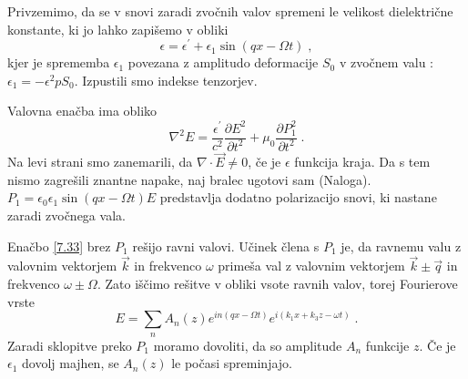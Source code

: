 \documentclass[11pt,fleqn]{book} %
\begin{document}
Privzemimo, da se v snovi zaradi zvočnih valov spremeni le velikost
dielektrične konstante, ki jo lahko zapišemo v obliki 
\begin{equation}
\epsilon=\epsilon^{\prime}+\epsilon_{1}\sin(qx-\Omega t)\;,\label{7.33}
\end{equation}
 kjer je sprememba $\epsilon_{1}$ povezana z amplitudo deformacije
$S_{0}$ v zvočnem valu :$\epsilon_{1}=-\epsilon^{2}pS_{0}$. Izpustili
smo indekse tenzorjev.

Valovna enačba ima obliko 
\begin{equation}
\nabla^{2}E=\frac{\epsilon^{\prime}}{c^{2}}{\frac{\partial E^{2}}{\partial t^{2}}}+\mu_{0}{\frac{\partial P_{1}^{2}}{\partial t^{2}}}\;.\label{7.33}
\end{equation}
 Na levi strani smo zanemarili, da $\nabla\cdot\vec{E}\ne0$, če je
$\epsilon$ funkcija kraja. Da s tem nismo zagrešili znantne napake,
naj bralec ugotovi sam (Naloga). $P_{1}=\epsilon_{0}\epsilon_{1}\sin(qx-\Omega t)E$
predstavlja dodatno polarizacijo snovi, ki nastane zaradi zvočnega
vala.

Enačbo \ref{7.33} brez $P_{1}$ rešijo ravni valovi. Učinek člena
s $P_{1}$ je, da ravnemu valu z valovnim vektorjem $\vec{k}$ in
frekvenco $\omega$ primeša val z valovnim vektorjem $\vec{k}\pm\vec{q}$
in frekvenco $\omega\pm\Omega$. Zato iščimo rešitve v obliki vsote
ravnih valov, torej Fourierove vrste 
\begin{equation}
E=\sum_{n}A_{n}(z)e^{in(qx-\Omega t)}e^{i(k_{1}x+k_{3}z-\omega t)}\;.\label{7.34}
\end{equation}
 Zaradi sklopitve preko $P_{1}$ moramo dovoliti, da so amplitude
$A_{n}$ funkcije $z$. Če je $\epsilon_{1}$ dovolj majhen, se $A_{n}(z)$
le počasi spreminjajo.
\end{document}
